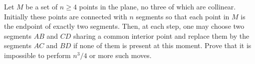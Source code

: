 Let 
$M$
 be a set of 
$n \ge 4$
 points in the plane, no three of which are collinear. Initially these points are connected with 
$n$
 segments so that each point in 
$M$
 is the endpoint of exactly two segments. Then, at each step, one may choose two segments 
$AB$
 and 
$CD$
 sharing a common interior point and replace them by the segments 
$AC$
 and 
$BD$
 if none of them is present at this moment. Prove that it is impossible to perform 
$n^3 /4$
 or more such moves.


